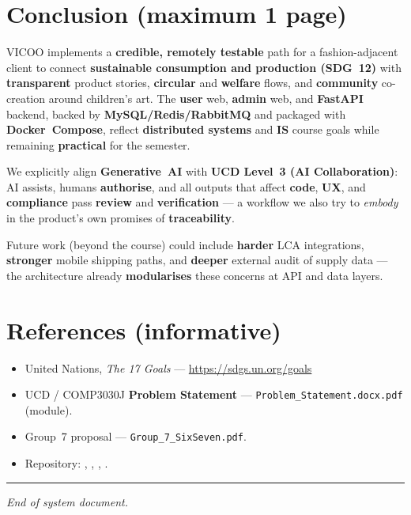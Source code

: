 \documentclass[11pt,a4paper]{article}
\begin{document}
\section{Conclusion (maximum 1 page)}

VICOO implements a \textbf{credible, remotely testable} path for a fashion-adjacent client to connect \textbf{sustainable consumption and production (SDG~12)} with \textbf{transparent} product stories, \textbf{circular} and \textbf{welfare} flows, and \textbf{community} co-creation around children's art. The \textbf{user} web, \textbf{admin} web, and \textbf{FastAPI} backend, backed by \textbf{MySQL/Redis/RabbitMQ} and packaged with \textbf{Docker~Compose}, reflect \textbf{distributed systems} and \textbf{IS} course goals while remaining \textbf{practical} for the semester.

We explicitly align \textbf{Generative~AI} with \textbf{UCD Level~3 (AI Collaboration)}: AI assists, humans \textbf{authorise}, and all outputs that affect \textbf{code}, \textbf{UX}, and \textbf{compliance} pass \textbf{review} and \textbf{verification} --- a workflow we also try to \emph{embody} in the product's own promises of \textbf{traceability}.

Future work (beyond the course) could include \textbf{harder} LCA integrations, \textbf{stronger} mobile shipping paths, and \textbf{deeper} external audit of supply data --- the architecture already \textbf{modularises} these concerns at API and data layers.

\section*{References (informative)}

\begin{itemize}[label=---, leftmargin=1.2em, itemsep=0.35em]
  \item United Nations, \emph{The 17 Goals} --- \url{https://sdgs.un.org/goals}
  \item UCD / COMP3030J \textbf{Problem Statement} --- \texttt{Problem\_Statement.docx.pdf} (module).
  \item Group~7 proposal --- \texttt{Group\_7\_SixSeven.pdf}.
  \item Repository: , , , .
\end{itemize}

\vspace{1.2em}
\hrule
\vspace{0.5em}
\begin{center}
\small\emph{End of system document.}
\end{center}
\end{document}
